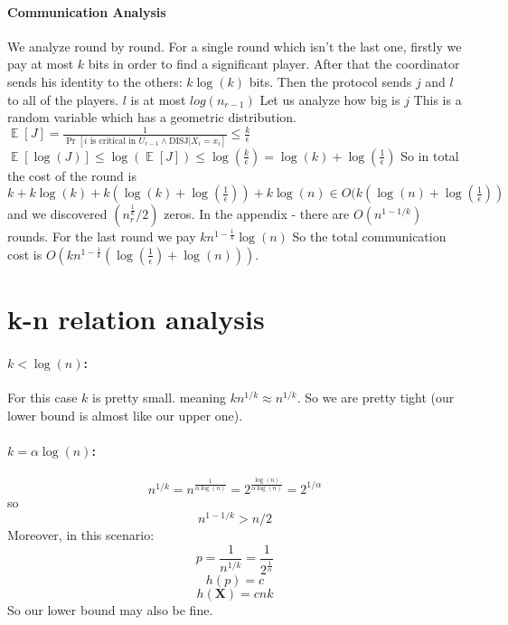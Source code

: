 \documentclass{article}
\newcommand{\rv}[1]{\mathbf{#1}}
\theoremstyle{plain}
\begin{document}
\paragraph{Communication Analysis}
We analyze round by round. \newline
For a single round which isn't the last one, firstly we pay at most $k$ bits in order to find a significant player. After that the coordinator sends his identity to the others: $k\log(k)$ bits. Then the protocol sends $j$ and $l$ to all of the players. $l$ is at most $log(n_{r-1})$
Let us analyze how big is $j$ \newline
This is a random variable which has a geometric distribution. \newline
$ \mathop{\mathbb{E}} [J] = \frac{1}{\Pr[\text{$i$ is critical in $U_{r-1}$} \land \text{DISJ} | X_i = x_i]} \leq \frac{k}{\epsilon}$ \newline
$\mathop{\mathbb{E}} [\log(J)] \leq \log(\mathop{\mathbb{E}} [J]) \leq \log(\frac{k}{\epsilon}) = \log(k) + \log(\frac{1}{\epsilon})$ \newline
So in total the cost of the round is $k + k\log(k) + k(\log(k) + \log(\frac{1}{\epsilon})) + k\log(n) \in O(k(\log(n) + \log(\frac{1}{\epsilon}))$ and we discovered $(n_r^{\frac{1}{k}}/2)$ zeros. \newline
In the appendix - there are $O(n^{1-1/k})$ rounds.
For the last round we pay $kn^{1-\frac{1}{k}} \log(n)$ \newline
So the total communication cost is  $O(kn^{1-\frac{1}{k}}(\log(\frac{1}{\epsilon}) + \log(n)))$.
\section{k-n relation analysis}
\paragraph{$k < \log(n)$:}
For this case $k$ is pretty small. meaning $kn^{1/k} \approx n^{1/k}$. So we are pretty tight (our lower bound is almost like our upper one).
\paragraph{$k = \alpha\log(n)$:}
\begin{equation*}
    n^{1/k} = n^{\frac{1}{\alpha\log(n)}} = 2^{\frac{\log(n)}{\alpha\log(n)}} = 2^{1/\alpha}
\end{equation*}
so
\begin{equation*}
    n^{1-1/k} > n/2
\end{equation*}
Moreover, in this scenario:
\begin{equation*}
    p = \frac{1}{n^{1/k}} = \frac{1}{2^{\frac{1}{\alpha}}} 
\end{equation*}
\begin{equation*}
    h(p) = c 
\end{equation*}
\begin{equation*}
    h(\rv{X}) = cnk
\end{equation*}
So our lower bound may also be fine.
\end{document}

